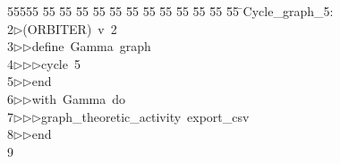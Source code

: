 %
%
\begin{tabbing}
55555 \= 55 \= 55 \= 55 \= 55 \= 55 \= 55 \= 55 \= 55 \= 55 \= 55 \= 55 \= 55 \= \>Cycle\_graph\_5:\\[0pt]
2\>$\triangleright$\>(ORBITER)\ v\ 2\ \\[0pt]
3\>$\triangleright$\>$\triangleright$\>define\ Gamma\ graph\ \\[0pt]
4\>$\triangleright$\>$\triangleright$\>$\triangleright$\>cycle\ 5\ \\[0pt]
5\>$\triangleright$\>$\triangleright$\>end\ \\[0pt]
6\>$\triangleright$\>$\triangleright$\>with\ Gamma\ do\ \\[0pt]
7\>$\triangleright$\>$\triangleright$\>$\triangleright$\>graph\_theoretic\_activity\ export\_csv\ \\[0pt]
8\>$\triangleright$\>$\triangleright$\>end\\[0pt]
9\>\end{tabbing}
